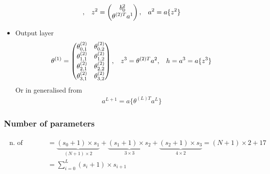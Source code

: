 \documentclass[a4paper,10pt]{article}
\begin{document}
\begin{itemize}
\begin{gather*}
            ,\hspace*{0.3cm}
            z^2 = 
            \begin{pmatrix}
                b_0^2 \\
                \theta^{(2)T}a^1 \\
            \end{pmatrix}
            ,\hspace*{0.3cm}
            a^2 = a\{z^2\} 
        \end{gather*}
    \item Output layer 
        \begin{gather*}
            \theta^{(1)} =
                \begin{pmatrix}
                    \theta_{0,1}^{(2)} & \theta_{0,2}^{(2)} \\
                    \theta_{1,1}^{(2)} & \theta_{1,2}^{(2)} \\
                    \theta_{2,1}^{(2)} & \theta_{2,2}^{(2)} \\
                    \theta_{3,1}^{(2)} & \theta_{3,2}^{(2)} \\
                \end{pmatrix}
                ,\hspace*{0.3cm}
                z^3 = \theta^{(2)T}a^2
                ,\hspace*{0.3cm}
                h = a^3 = a\{z^3\} 
            \end{gather*}
            Or in generalised from
            \begin{gather*}
                a^{L+1} = a\{\theta^{(L)T}a^L\}
            \end{gather*}
\end{itemize}

\subsubsection{Number of parameters}
\begin{gather*}
    \begin{split}
        \text{n. of parameters} &= \underbrace{(s_0+1)\times s_1}_{(N+1)\times 2} + \underbrace{(s_1+1)\times s_2}_{3\times 3} + \underbrace{(s_2+1)\times s_3}_{4\times 2} = (N+1)\times 2+17\\
        & = \sum_{i=0}^{L}(s_i+1)\times s_{i+1}
    \end{split}
\end{gather*}
\end{document}
